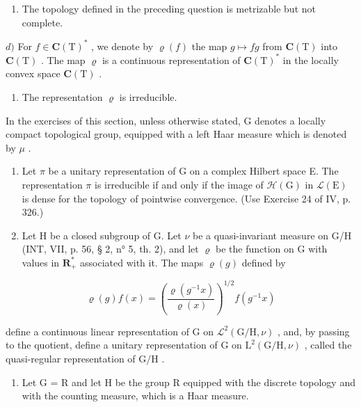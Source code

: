 \begin{enumerate}
\def\labelenumi{\alph{enumi})}
\setcounter{enumi}{2}
\tightlist
\item
  The topology defined in the preceding question is metrizable but not complete.
\end{enumerate}

\(d)\) For \(f \in \mathbf{C}(\mathrm{T})^*\) , we denote by \(\varrho(f)\) the map \(g \mapsto fg\) from \(\mathbf{C}(\mathrm{T})\) into \(\mathbf{C}(\mathrm{T})\) . The map \(\varrho\) is a continuous representation of \(\mathbf{C}(\mathrm{T})^*\) in the locally convex space \(\mathbf{C}(\mathrm{T})\) .

\begin{enumerate}
\def\labelenumi{\alph{enumi})}
\setcounter{enumi}{4}
\tightlist
\item
  The representation \(\varrho\) is irreducible.
\end{enumerate}

\exercisesection{}

In the exercises of this section, unless otherwise stated, G denotes a locally compact topological group, equipped with a left Haar measure which is denoted by \(\mu\) .

\begin{enumerate}
\def\labelenumi{\arabic{enumi})}
\item
  Let \(\pi\) be a unitary representation of G on a complex Hilbert space E. The representation \(\pi\) is irreducible if and only if the image of \(\mathcal{H}(\mathrm{G})\) in \(\mathcal{L}(\mathrm{E})\) is dense for the topology of pointwise convergence. (Use Exercise 24 of IV, p. 326.)
\item
  Let H be a closed subgroup of G. Let \(\nu\) be a quasi-invariant measure on G/H (INT, VII, p. 56, § 2, n° 5, th. 2), and let \(\varrho\) be the function on G with values in \(\mathbf{R}_{+}^{*}\) associated with it. The maps \(\varrho(g)\) defined by
\end{enumerate}

\[
\varrho (g) f (x) = \left(\frac {\varrho (g ^ {- 1} x)}{\varrho (x)}\right) ^ {1 / 2} f (g ^ {- 1} x)
\]

define a continuous linear representation of G on \(\mathcal{L}^{2}(\mathrm{G / H},\nu)\) , and, by passing to the quotient, define a unitary representation of G on \(\mathrm{L}^2 (\mathrm{G / H},\nu)\) , called the quasi-regular representation of \(\mathrm{G / H}\) .

\begin{enumerate}
\def\labelenumi{\arabic{enumi})}
\setcounter{enumi}{2}
\tightlist
\item
  Let G = R and let H be the group R equipped with the discrete topology and with the counting measure, which is a Haar measure.
\end{enumerate}

